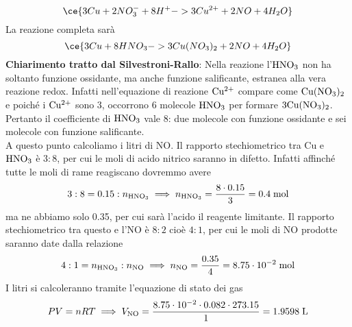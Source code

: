 \begin{soluzione}
    \begin{equation*}
        \ce{3Cu + 2NO_3^- + 8H^+ -> 3Cu^{2+} + 2NO + 4H_2O}
    \end{equation*}
    La reazione completa sarà
    \begin{equation*}
        \ce{3Cu + 8HNO_3 -> 3Cu(NO_3)_2 + 2NO + 4H_2O}
    \end{equation*}
    \textbf{Chiarimento tratto dal Silvestroni-Rallo}: Nella reazione l'$\rm HNO_3$ non ha soltanto funzione ossidante, ma anche funzione salificante, estranea alla vera reazione redox. Infatti nell'equazione di reazione $\rm Cu^{2+}$ compare come $\rm Cu(NO_3)_2$ e poiché i $\rm Cu^{2+}$ sono 3, occorrono 6 molecole $\rm HNO_3$ per formare $\rm 3Cu(NO_3)_2$. Pertanto il coefficiente di $\rm HNO_3$ vale 8: due molecole con funzione ossidante e sei molecole con funzione salificante.\\
    A questo punto calcoliamo i litri di NO. Il rapporto stechiometrico tra Cu e $\rm HNO_3$ è $3:8$, per cui le moli di acido nitrico saranno in difetto. Infatti affinché tutte le moli di rame reagiscano dovremmo avere
    \begin{equation*}
        3:8=0.15:n_{\rm HNO_3}
        \implies
        n_{\rm HNO_3}
        =\frac{8 \cdot 0.15}{3}
        =0.4 \; \rm mol
    \end{equation*}
    ma ne abbiamo solo 0.35, per cui sarà l'acido il reagente limitante. Il rapporto stechiometrico tra questo e l'NO è $8:2$ cioè $4:1$, per cui le moli di NO prodotte saranno date dalla relazione
    \begin{equation*}
        4:1=n_{\rm HNO_3}:n_{\rm NO}
        \implies
        n_{\rm NO}
        =\frac{0.35}{4}
        =8.75 \cdot 10^{-2} \; \rm mol
    \end{equation*}
    I litri si calcoleranno tramite l'equazione di stato dei gas
    \begin{equation*}
        PV=nRT
        \implies
        V_{\rm NO}
        =\frac{8.75 \cdot 10^{-2} \cdot 0.082 \cdot 273.15}{1}
        =1.9598 \; \rm L
    \end{equation*}
\end{soluzione}

\newpage

